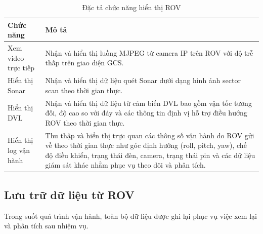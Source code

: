 \documentclass[../DoAn.tex]{subfiles}
\begin{document}
\begin{table}[H]

\centering

\renewcommand{\arraystretch}{1.3}

\begin{tabular}{|l|p{9cm}|}

\hline

\textbf{Chức năng} & \textbf{Mô tả} \\

\hline
Xem video trực tiếp &
Nhận và hiển thị luồng MJPEG từ camera IP trên ROV với độ
trễ thấp trên giao diện GCS. \\

\hline

Hiển thị Sonar &
Nhận và hiển thị dữ liệu quét Sonar dưới dạng hình ảnh
sector scan theo thời gian thực. \\

\hline

Hiển thị DVL &
Nhận và hiển thị dữ liệu từ cảm biến DVL  bao gồm vận tốc tương đối,
độ cao so với đáy và các thông tin định vị hỗ trợ điều hướng ROV
theo thời gian thực. \\

\hline

Hiển thị log vận hành &
Thu thập và hiển thị trực quan các thông số vận hành do ROV gửi về theo
thời gian thực như góc định hướng (roll, pitch, yaw), chế độ điều khiển,
trạng thái đèn, camera, trạng thái pin và các dữ liệu giám sát khác nhằm phục vụ
theo dõi và phân tích. \\

\hline

\end{tabular}

\caption{Đặc tả chức năng hiển thị ROV}

\label{tab:video_sonar}

\end{table}

\subsection{Lưu trữ dữ liệu từ ROV}

Trong suốt quá trình vận hành, toàn bộ dữ liệu được ghi lại phục vụ việc
xem lại và phân tích sau nhiệm vụ.
\end{document}

